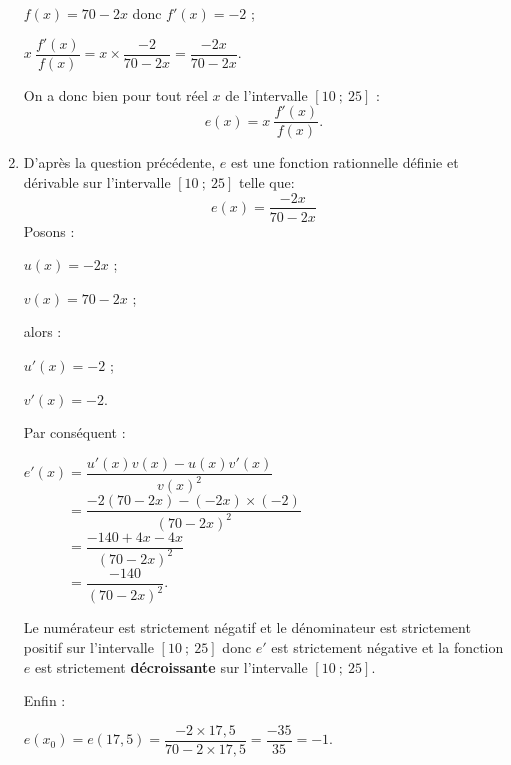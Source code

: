 \begin{corrige}
\begin{enumerate}
          $f(x)=70-2x$ donc $f'(x)=-2$ ;
          \par
          $x\ \dfrac{f'(x)}{f(x)} = x \times \dfrac{-2}{70-2x}=\dfrac{-2x}{70-2x}$.
          \par
          On a donc bien pour tout réel $x$ de l'intervalle $[10~;~25]$ :
          \[ e(x)=x\ \dfrac{f'(x)}{f(x)}. \]
          \item
          D'après la question précédente, $e$ est une fonction rationnelle définie et dérivable sur l'intervalle $[10~;~25]$ telle que:
          \[ e(x)=\dfrac{-2x}{70-2x} \]
          Posons :
          \par
          $u(x)=-2x$ ;
          \par
          $v(x)=70-2x$ ;
          \par
          alors :
          \par
          $u'(x)=-2$ ;
          \par
          $v'(x)=-2$.
          \par
          Par conséquent :
          \par
          $e'(x)= \dfrac{u'(x)v(x)-u(x)v'(x)}{v(x)^2}$\\
          $\phantom{e'(x)}=\dfrac{-2(70-2x)-(-2x) \times (-2)}{(70-2x)^2}$\\
          $\phantom{e'(x)}= \dfrac{-140+4x-4x}{(70-2x)^2}$\\
          $\phantom{e'(x)}= \dfrac{-140}{(70-2x)^2}.$
          \par
          Le numérateur est strictement négatif et le dénominateur est strictement positif sur l'intervalle $[10~;~25]$ donc $e'$ est strictement négative et la fonction $e$ est strictement \textbf{décroissante} sur l'intervalle $[10~;~25]$.
          \par
          Enfin :
          \par
          $e(x_0)=e(17,5)=\dfrac{-2 \times 17,5}{70-2 \times 17,5}$\nosp$=\dfrac{-35}{35}=-1$.
          \par
     \end{enumerate}
\end{corrige}
